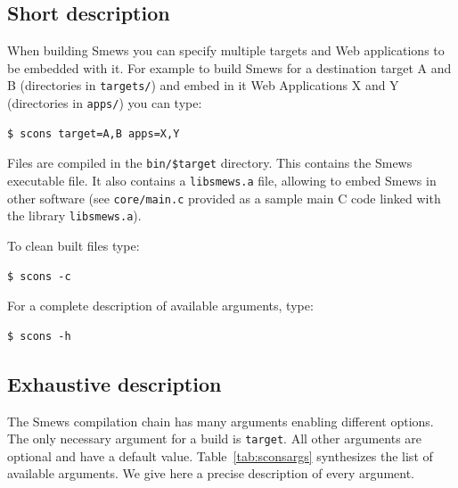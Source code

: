 \documentclass{report}
\newcommand{\rtab}[1]{Table~\ref{tab:#1}}
\begin{document}
\subsection{Short description}

When building Smews you can specify multiple targets and Web applications to be embedded with it. For example to build Smews for a destination target A and B (directories in \verb+targets/+) and embed in it Web Applications X and Y (directories in \verb+apps/+) you can type:

\begin{verbatim}
$ scons target=A,B apps=X,Y
\end{verbatim}

Files are compiled in the \verb+bin/$target+ directory. This contains the Smews executable file. It also contains a \verb+libsmews.a+ file, allowing to embed Smews in other software (see \verb+core/main.c+ provided as a sample main C code linked with the library \verb+libsmews.a+).

To clean built files type:
\begin{verbatim}
$ scons -c
\end{verbatim}

For a complete description of available arguments, type:
\begin{verbatim}
$ scons -h
\end{verbatim}

\subsection{Exhaustive description}

The Smews compilation chain has many arguments enabling different options. The only necessary argument for a build is \verb+target+. All other arguments are optional and have a default value. \rtab{sconsargs} synthesizes the list of available arguments. We give here a precise description of every argument.
\end{document}
